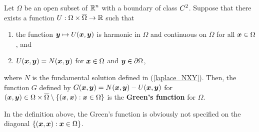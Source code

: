 \begin{defn} \label{DefnGreenFunct}
Let $\Omega$ be an open subset of $\displaystyle \mathbb{R}^n$ with a
boundary of class $\displaystyle C^2$.  Suppose that there exists a function
$U: \Omega \times \overline{\Omega} \to \mathbb{R}$ such that
\begin{enumerate}
\item the function ${\bm{y}} \mapsto U({\bm{x}},{\bm{y}})$
is harmonic in $\Omega$ and continuous on $\overline{\Omega}$ for all
${\bm{x}} \in \Omega$, and
\item $U({\bm{x}},{\bm{y}}) = N({\bm{x}},{\bm{y}})$ for ${\bm{x}}\in \Omega$ and
${\bm{y}} \in \partial \Omega$,
\end{enumerate}
where $N$ is the fundamental solution defined in (\ref{laplace_NXY}).
Then, the function $G$ defined by
$G({\bm{x}},{\bm{y}}) = N({\bm{x}},{\bm{y}}) - U({\bm{x}},{\bm{y}})$
for $({\bm{x}},{\bm{y}}) \in \Omega \times \overline{\Omega}
\setminus \{ ({\bm{x}},{\bm{x}}) : {\bm{x}} \in \Omega \}$
is the {\bfseries Green's function} for $\Omega$.
\end{defn}

In the definition above, the Green's function is obviously not
specified on the diagonal $\{ ({\bm{x}},{\bm{x}}) : {\bm{x}} \in \Omega\}$.

